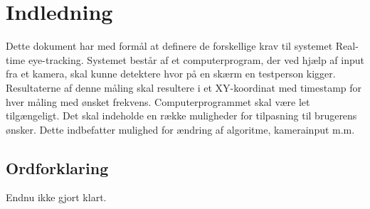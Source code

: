 \documentclass[kravspec.tex]{subfiles}
\begin{document}
	
\section{Indledning}
Dette dokument har med formål at definere de forskellige krav til systemet Real-time eye-tracking. 
Systemet består af et computerprogram, der ved hjælp af input fra et kamera, skal kunne detektere hvor på en skærm en testperson kigger. Resultaterne af denne måling skal resultere i et XY-koordinat med timestamp for hver måling med ønsket frekvens.
Computerprogrammet skal være let tilgængeligt. Det skal indeholde en række muligheder for tilpasning til brugerens ønsker. Dette indbefatter mulighed for ændring af algoritme, kamerainput m.m. 

\subsection{Ordforklaring}
Endnu ikke gjort klart. 
\end{document}
